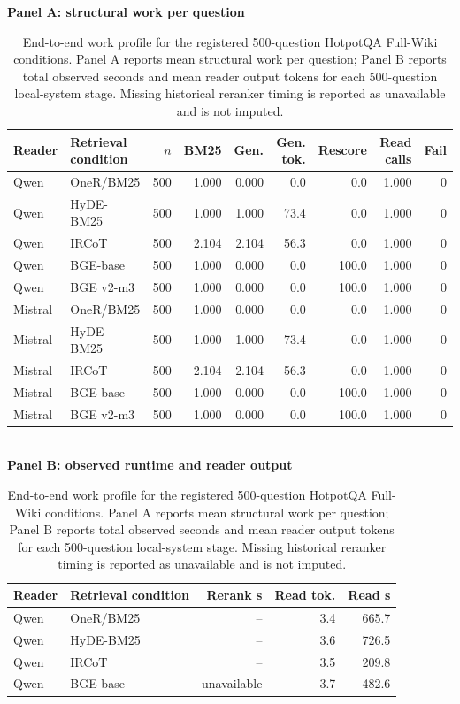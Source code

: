 \begin{table}[t]
\centering
\caption{End-to-end work profile for the registered 500-question HotpotQA Full-Wiki conditions. Panel A reports mean structural work per question; Panel B reports total observed seconds and mean reader output tokens for each 500-question local-system stage. Missing historical reranker timing is reported as unavailable and is not imputed.}
\label{tab:fullwiki_system_cost}
\scriptsize
\textbf{Panel A: structural work per question}\\[2pt]
\setlength{\tabcolsep}{2.8pt}
\begin{tabular}{llrrrrrrr}
\toprule
Reader & Retrieval condition & $n$ & BM25 & Gen. & Gen. tok. & Rescore & Read calls & Fail \\
\midrule
Qwen & OneR/BM25 & 500 & 1.000 & 0.000 & 0.0 & 0.0 & 1.000 & 0 \\
Qwen & HyDE-BM25 & 500 & 1.000 & 1.000 & 73.4 & 0.0 & 1.000 & 0 \\
Qwen & IRCoT & 500 & 2.104 & 2.104 & 56.3 & 0.0 & 1.000 & 0 \\
Qwen & BGE-base & 500 & 1.000 & 0.000 & 0.0 & 100.0 & 1.000 & 0 \\
Qwen & BGE v2-m3 & 500 & 1.000 & 0.000 & 0.0 & 100.0 & 1.000 & 0 \\
\midrule
Mistral & OneR/BM25 & 500 & 1.000 & 0.000 & 0.0 & 0.0 & 1.000 & 0 \\
Mistral & HyDE-BM25 & 500 & 1.000 & 1.000 & 73.4 & 0.0 & 1.000 & 0 \\
Mistral & IRCoT & 500 & 2.104 & 2.104 & 56.3 & 0.0 & 1.000 & 0 \\
Mistral & BGE-base & 500 & 1.000 & 0.000 & 0.0 & 100.0 & 1.000 & 0 \\
Mistral & BGE v2-m3 & 500 & 1.000 & 0.000 & 0.0 & 100.0 & 1.000 & 0 \\
\bottomrule
\end{tabular}
\\[6pt]
\textbf{Panel B: observed runtime and reader output}\\[2pt]
\begin{tabular}{llrrr}
\toprule
Reader & Retrieval condition & Rerank s & Read tok. & Read s \\
\midrule
Qwen & OneR/BM25 & -- & 3.4 & 665.7 \\
Qwen & HyDE-BM25 & -- & 3.6 & 726.5 \\
Qwen & IRCoT & -- & 3.5 & 209.8 \\
Qwen & BGE-base & unavailable & 3.7 & 482.6 \\

\end{tabular}
\end{table}
